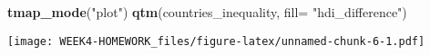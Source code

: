 \documentclass[
]{article}
\newenvironment{Shaded}{\begin{snugshade}}{\end{snugshade}}
\newcommand{\AttributeTok}[1]{\textcolor[rgb]{0.13,0.29,0.53}{#1}}
\newcommand{\FunctionTok}[1]{\textcolor[rgb]{0.13,0.29,0.53}{\textbf{#1}}}
\newcommand{\NormalTok}[1]{#1}
\newcommand{\StringTok}[1]{\textcolor[rgb]{0.31,0.60,0.02}{#1}}
\begin{document}
\begin{Shaded}
\begin{Highlighting}[]
\FunctionTok{tmap\_mode}\NormalTok{(}\StringTok{"plot"}\NormalTok{)}
\FunctionTok{qtm}\NormalTok{(countries\_inequality, }\AttributeTok{fill=} \StringTok{"hdi\_difference"}\NormalTok{)}
\end{Highlighting}
\end{Shaded}

\texttt{[image: WEEK4-HOMEWORK\_files/figure-latex/unnamed-chunk-6-1.pdf]}
\end{document}

